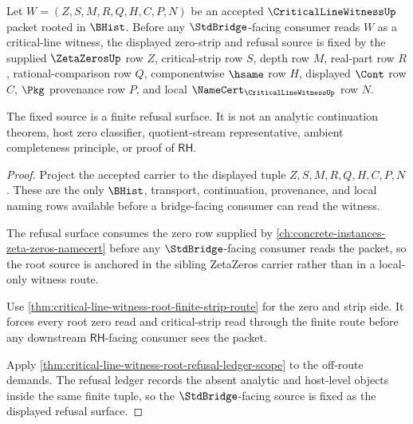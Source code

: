 \begin{theorem}
\label{thm:critical-line-witness-root-stdbridge-refusal-source}
Let $W=(Z,S,M,R,Q,H,C,P,N)$ be an accepted $\CriticalLineWitnessUp$ packet rooted in $\BHist$. Before any $\StdBridge$-facing consumer reads $W$ as a critical-line witness, the displayed zero-strip and refusal source is fixed by the supplied $\ZetaZerosUp$ row $Z$, critical-strip row $S$, depth row $M$, real-part row $R$, rational-comparison row $Q$, componentwise $\hsame$ row $H$, displayed $\Cont$ row $C$, $\Pkg$ provenance row $P$, and local $\NameCert_{\CriticalLineWitnessUp}$ row $N$.

The fixed source is a finite refusal surface. It is not an analytic continuation theorem, host zero classifier, quotient-stream representative, ambient completeness principle, or proof of $\mathsf{RH}$.
\end{theorem}
\begin{proof}
Project the accepted carrier to the displayed tuple $Z,S,M,R,Q,H,C,P,N$. These are the only $\BHist$, transport, continuation, provenance, and local naming rows available before a bridge-facing consumer can read the witness.

The refusal surface consumes the zero row supplied by \autoref{ch:concrete-instances-zeta-zeros-namecert} before any $\StdBridge$-facing consumer reads the packet, so the root source is anchored in the sibling ZetaZeros carrier rather than in a local-only witness route.

Use \autoref{thm:critical-line-witness-root-finite-strip-route} for the zero and strip side. It forces every root zero read and critical-strip read through the finite route before any downstream $\mathsf{RH}$-facing consumer sees the packet.

Apply \autoref{thm:critical-line-witness-root-refusal-ledger-scope} to the off-route demands. The refusal ledger records the absent analytic and host-level objects inside the same finite tuple, so the $\StdBridge$-facing source is fixed as the displayed refusal surface.
\end{proof}

